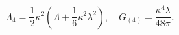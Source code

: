 \begin{equation}\label{lam4def}
  \Lambda_4 = \frac12 \kappa^2(\Lambda+\frac16 \kappa^2 \lambda  ^2),
  \quad  G_{(4)}=\frac{\kappa^4 \lambda  }{48 \pi }.
\end{equation}

